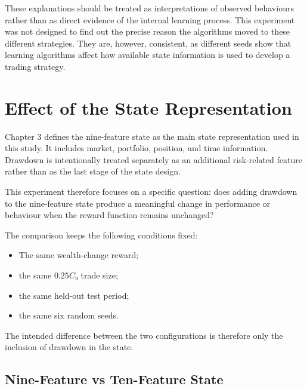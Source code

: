 These explanations should be treated as interpretations of observed
behaviours rather than as direct evidence of the internal learning
process. This experiment was not designed to find out the precise reason
the algorithms moved to these different strategies. They are, however,
consistent, as different seeds show that learning algorithms affect how
available state information is used to develop a trading strategy.

\section{Effect of the State Representation}

Chapter 3 defines the nine-feature state as the main state
representation used in this study. It includes market, portfolio,
position, and time information. Drawdown is intentionally treated
separately as an additional risk-related feature rather than as the last
stage of the state design.

This experiment therefore focuses on a specific question: does adding
drawdown to the nine-feature state produce a meaningful change in
performance or behaviour when the reward function remains unchanged?

The comparison keeps the following conditions fixed:

\begin{itemize}
\item
  The same wealth-change reward;
\item
  the same \(0.25C₀\) trade size;
\item
  the same held-out test period;
\item
  the same six random seeds.
\end{itemize}

The intended difference between the two configurations is therefore only
the inclusion of drawdown in the state.

\subsection{Nine-Feature vs Ten-Feature State}

